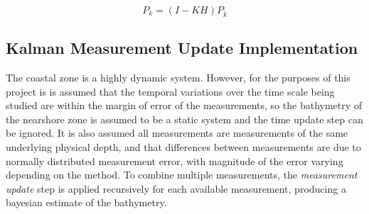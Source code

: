 \begin{equation}
    P_k = (I - KH)P_{\bar{k}}
\end{equation}


\subsection{Kalman Measurement Update Implementation}
The coastal zone is a highly dynamic system. However, for the purposes of this project is is assumed that the temporal variations over the time scale being studied are within the margin of error of the measurements, so the bathymetry of the nearshore zone is assumed to be a static system and the time update step can be ignored. It is also assumed all measurements are measurements of the same underlying physical depth, and that differences between measurements are due to normally distributed measurement error, with magnitude of the error varying depending on the method. To combine multiple measurements, the \emph{measurement update} step is applied recursively for each available measurement, producing a bayesian estimate of the bathymetry.  

